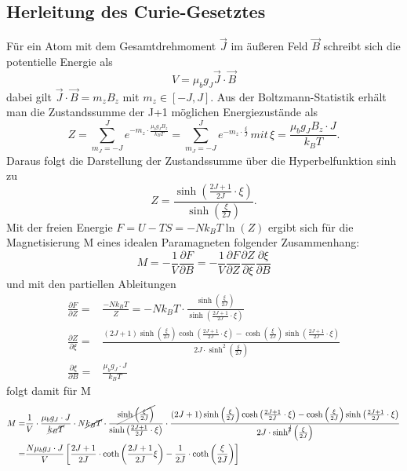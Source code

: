 \documentclass[twoside,colorback,accentcolor=tud4c,11pt]{tudreport}
\begin{document}
\subsection{Herleitung des Curie-Gesetztes}
Für ein Atom mit dem Gesamtdrehmoment $\vec{J}$ im äußeren Feld $\vec{B}$ schreibt sich die potentielle Energie als
\begin{equation}
V=\mu_{b} g_{J}\vec{J}\cdot\vec{B}
\end{equation}
dabei gilt $\vec{J}\cdot\vec{B} =m_{z}B_{z}$ mit $m_{z}\in\left[-J,J\right]$. Aus der Boltzmann-Statistik erhält man die Zustandssumme der J+1 möglichen Energiezustände als
\begin{equation}
Z=\sum_{m_{J}=-J}^{J} e^{-m_{z}\cdot\frac{\mu_{b}g_{J}B_{z}}{k_{B}T}}=\sum_{m_{J}=-J}^{J} e^{-m_{z}\cdot\frac{\xi}{J}}\,mit\, \xi = \frac{\mu_{b}g_{J}B_{z}\cdot J}{k_{B}T}.
\end{equation}
Daraus folgt die Darstellung der Zustandssumme über die Hyperbelfunktion sinh zu
\begin{equation}
Z=\frac{\sinh\left(\frac{2J+1}{2J}\cdot\xi\right)}{\sinh\left(\frac{\xi}{2J}\right)}.
\end{equation}
Mit der freien Energie $F=U-TS=-Nk_{B}T\ln(Z)$ ergibt sich für die Magnetisierung M eines idealen Paramagneten folgender Zusammenhang:
\begin{equation}
M=-\frac{1}{V}\frac{\partial F}{\partial B}=-\frac{1}{V}\frac{\partial F}{\partial Z}\frac{\partial Z}{\partial \xi}\frac{\partial \xi}{\partial B}
\end{equation}
und mit den partiellen Ableitungen
\begin{align}
\frac{\partial F}{\partial Z}=&\frac{-Nk_{B}T}{Z}=-Nk_{B}T\cdot\frac{\sinh\left(\frac{\xi}{2J}\right)}{\sinh\left(\frac{2J+1}{2J}\cdot\xi\right)}\\
\frac{\partial Z}{\partial \xi}=&\frac{(2J+1)\sinh\left(\frac{\xi}{2J}\right)\cosh\left(\frac{2J+1}{2J}\cdot\xi\right)-\cosh\left(\frac{\xi}{2J}\right)\sinh\left(\frac{2J+1}{2J}\cdot\xi\right)}{2J\cdot\sinh^2\left(\frac{\xi}{2J}\right)}\\
\frac{\partial \xi}{\partial B}=&\frac{\mu_{b}g_{J}\cdot J}{k_{B}T}
\end{align}
folgt damit für M
\begin{align}
M=&\frac{1}{V}\cdot\frac{\mu_{b}g_{J}\cdot J}{\cancel{ k_{B}T}}\cdot N \cancel{k_{B}T}\cdot\frac{\cancel{\sinh\left(\frac{\xi}{2J}\right)}}{\sinh\left(\frac{2J+1}{2J}\cdot\xi\right)}\cdot\frac{(2J+1)\sinh\left(\frac{\xi}{2J}\right)\cosh\left(\frac{2J+1}{2J}\cdot\xi\right)-\cosh\left(\frac{\xi}{2J}\right)\sinh\left(\frac{2J+1}{2J}\cdot\xi\right)}{2J\cdot\sinh^{\cancel{2}}\left(\frac{\xi}{2J}\right)}\\
=&\frac{N\mu_{b}g_{J}\cdot J}{V}\left[\frac{2J+1}{2J}\cdot\coth\left(\frac{2J+1}{2J}\xi\right)-\frac{1}{2J}\cdot\coth\left(\frac{\xi}{2J}\right)\right]
\end{align}
\end{document}

